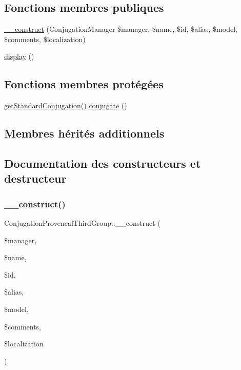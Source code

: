 \subsection*{Fonctions membres publiques}
\begin{DoxyCompactItemize}
\item 
\hyperlink{class_conjugation_provencal_third_group_afed342691cc7dc2dd626040c8fa26774}{\+\_\+\+\_\+construct} (Conjugation\+Manager \$manager, \$name, \$id, \$alias, \$model, \$comments, \$localization)
\item 
\hyperlink{class_conjugation_provencal_third_group_a5be367146782812cba9ff8209cf79be2}{display} ()
\end{DoxyCompactItemize}
\subsection*{Fonctions membres protégées}
\begin{DoxyCompactItemize}
\item 
\hyperlink{class_conjugation_base_a97684bf47a4b158a2d4f5716f9187730}{get\+Standard\+Conjugation}() \hyperlink{class_conjugation_provencal_third_group_ab4005ad44671e23386f8ef1f833b6959}{conjugate} ()
\end{DoxyCompactItemize}
\subsection*{Membres hérités additionnels}


\subsection{Documentation des constructeurs et destructeur}
\hypertarget{class_conjugation_provencal_third_group_afed342691cc7dc2dd626040c8fa26774}{}\label{class_conjugation_provencal_third_group_afed342691cc7dc2dd626040c8fa26774} 
\subsubsection{\texorpdfstring{\+\_\+\+\_\+construct()}{\_\_construct()}}
{\footnotesize\ttfamily Conjugation\+Provencal\+Third\+Group\+::\+\_\+\+\_\+construct (\begin{DoxyParamCaption}\item[{Conjugation\+Manager}]{\$manager,  }\item[{}]{\$name,  }\item[{}]{\$id,  }\item[{}]{\$alias,  }\item[{}]{\$model,  }\item[{}]{\$comments,  }\item[{}]{\$localization }\end{DoxyParamCaption})}



